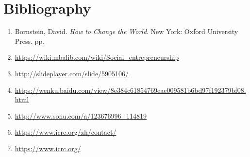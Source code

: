 \documentclass[12pt]{article}
\begin{document}
\section{Bibliography}
\begin{enumerate}
\item Bornstein, David. \emph{How to Change the World}. New York: Oxford University Press. pp. 
\item \url{https://wiki.mbalib.com/wiki/Social_entrepreneurship}
\item \url{http://slideplayer.com/slide/5905106/}
\item \url{https://wenku.baidu.com/view/8e384c61854769eae009581b6bd97f192379bf08.html}
\item \url{http://www.sohu.com/a/123676996_114819}
\item \url{https://www.icrc.org/zh/contact/}
\item \url{https://www.icrc.org/}

\end{enumerate}
\end{document}
